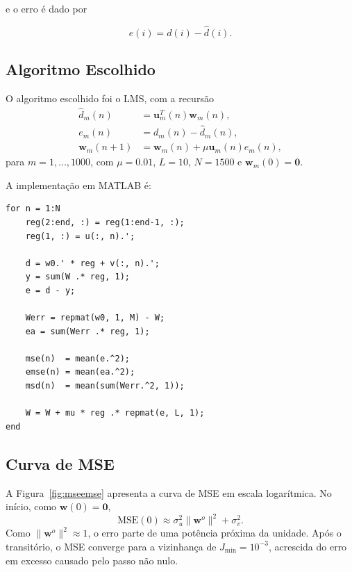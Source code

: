\documentclass[12pt,a4paper]{article}
\newcommand{\wtrue}{\mathbf{w}^{o}}
\newcommand{\uvec}{\mathbf{u}}
\begin{document}
e o erro é dado por

\begin{equation}
    e(i) = d(i) - \hat{d}(i).
\end{equation}

\subsection{Algoritmo Escolhido}

O algoritmo escolhido foi o LMS, com a recursão
\begin{equation}
\boxed{
\begin{aligned}
\widehat d_m(n)&=\uvec_m^{T}(n)\mathbf{w}_m(n),\\
e_m(n)&=d_m(n)-\widehat d_m(n),\\
\mathbf{w}_m(n+1)&=\mathbf{w}_m(n)+\mu\uvec_m(n)e_m(n),
\end{aligned}}
\end{equation}
para \(m=1,\ldots,1000\), com \(\mu=0.01\), \(L=10\), \(N=1500\) e \(\mathbf{w}_m(0)=\mathbf{0}\).

A implementação em MATLAB é:
\begin{lstlisting}[style=matlabstyle,caption={Núcleo da recursão LMS em paralelo.}]
for n = 1:N
    reg(2:end, :) = reg(1:end-1, :);
    reg(1, :) = u(:, n).';

    d = w0.' * reg + v(:, n).';
    y = sum(W .* reg, 1);
    e = d - y;

    Werr = repmat(w0, 1, M) - W;
    ea = sum(Werr .* reg, 1);

    mse(n)  = mean(e.^2);
    emse(n) = mean(ea.^2);
    msd(n)  = mean(sum(Werr.^2, 1));

    W = W + mu * reg .* repmat(e, L, 1);
end
\end{lstlisting}

\subsection{Curva de MSE}

A Figura~\ref{fig:mseemse} apresenta a curva de MSE em escala logarítmica. No início, como \(\mathbf{w}(0)=\mathbf{0}\),
\begin{equation}
\mathrm{MSE}(0)\approx \sigma_u^2\|\wtrue\|^2+\sigma_v^2.
\end{equation}
Como \(\|\wtrue\|^2\approx1\), o erro parte de uma potência próxima da unidade. Após o transitório, o MSE converge para a vizinhança de \(J_{\min}=10^{-3}\), acrescida do erro em excesso causado pelo passo não nulo.
\end{document}
